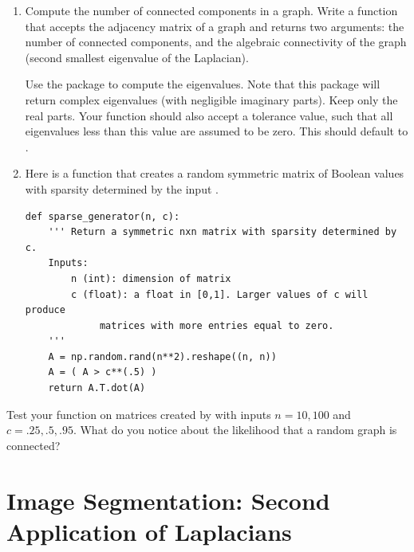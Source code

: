 \begin{problem}
\leavevmode
\begin{enumerate}
\item Compute the number of connected components in a graph.
Write a function that accepts the adjacency matrix of a graph and returns two arguments: the number of connected components, and the algebraic connectivity of the graph (second smallest eigenvalue of the Laplacian).

Use the  package to compute the eigenvalues.
Note that this package will return complex eigenvalues (with negligible imaginary parts). Keep only the real parts.
Your function should also accept a tolerance value, such that all eigenvalues less than this value are assumed to be zero.
This should default to .

\item Here is a function that creates a random symmetric matrix of Boolean values with sparsity determined by the input .
\begin{lstlisting}
def sparse_generator(n, c):
    ''' Return a symmetric nxn matrix with sparsity determined by c.
    Inputs:
        n (int): dimension of matrix
        c (float): a float in [0,1]. Larger values of c will produce
             matrices with more entries equal to zero.
    '''
    A = np.random.rand(n**2).reshape((n, n))
    A = ( A > c**(.5) )
    return A.T.dot(A)
\end{lstlisting}
\end{enumerate}

Test your function on matrices created by  with inputs $n = 10, 100$ and $c = .25, .5, .95$. 
What do you notice about the likelihood that a random graph is connected?
\end{problem}


\section*{Image Segmentation: Second Application of Laplacians}

